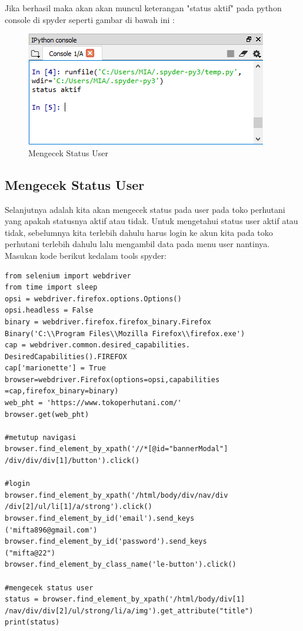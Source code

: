 \newpage
Jika berhasil maka akan akan muncul keterangan "status aktif" pada python console di spyder seperti gambar di bawah ini :
\begin{figure}[h]
	\centering
	\includegraphics[scale=0.6]{figures/statususermia}
	\caption{Mengecek Status User}
\end{figure}


\newpage
\subsection{Mengecek Status User}
Selanjutnya adalah kita akan mengecek status pada user pada toko perhutani yang apakah statusnya aktif atau tidak. Untuk mengetahui status user aktif atau tidak, sebelumnya kita terlebih dahulu harus login ke akun kita pada toko perhutani terlebih dahulu lalu mengambil data pada menu user nantinya.
Masukan kode berikut kedalam tools spyder:
\begin{verbatim}
from selenium import webdriver
from time import sleep
opsi = webdriver.firefox.options.Options()
opsi.headless = False
binary = webdriver.firefox.firefox_binary.Firefox
Binary('C:\\Program Files\\Mozilla Firefox\\firefox.exe')
cap = webdriver.common.desired_capabilities.
DesiredCapabilities().FIREFOX
cap['marionette'] = True
browser=webdriver.Firefox(options=opsi,capabilities
=cap,firefox_binary=binary)
web_pht = 'https://www.tokoperhutani.com/'
browser.get(web_pht)

#metutup navigasi
browser.find_element_by_xpath('//*[@id="bannerModal"]
/div/div/div[1]/button').click()

#login
browser.find_element_by_xpath('/html/body/div/nav/div
/div[2]/ul/li[1]/a/strong').click()
browser.find_element_by_id('email').send_keys
('mifta896@gmail.com')
browser.find_element_by_id('password').send_keys
("mifta@22")
browser.find_element_by_class_name('le-button').click()

#mengecek status user
status = browser.find_element_by_xpath('/html/body/div[1]
/nav/div/div[2]/ul/strong/li/a/img').get_attribute("title")
print(status)
\end{verbatim}

